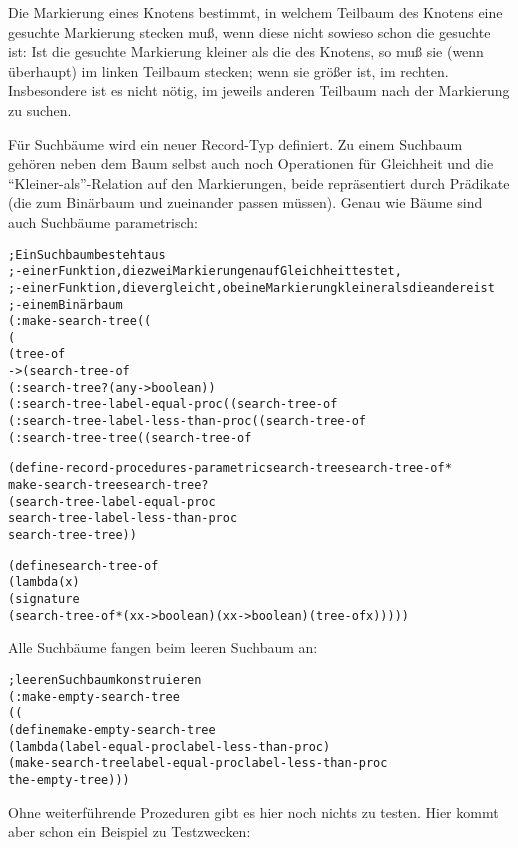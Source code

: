 Die Markierung eines Knotens bestimmt,
in welchem Teilbaum
des Knotens eine gesuchte Markierung stecken muß, wenn diese nicht sowieso schon die gesuchte ist: Ist die gesuchte
Markierung kleiner als die des Knotens, so muß sie (wenn überhaupt) im
linken Teilbaum stecken; wenn sie größer ist, im rechten.
Insbesondere ist es nicht nötig, im jeweils anderen Teilbaum nach der
Markierung zu suchen.

Für Suchbäume wird ein neuer Record-Typ
definiert. Zu einem Suchbaum
gehören neben dem Baum selbst auch noch Operationen für
Gleichheit und die "`Kleiner-als"'-Relation auf den Markierungen, beide repräsentiert durch
Prädikate (die zum Binärbaum und zueinander passen müssen).  Genau wie
Bäume sind auch Suchbäume parametrisch:
%
\begin{alltt}
; Ein Suchbaum besteht aus
; - einer Funktion, die zwei Markierungen auf Gleichheit testet,
; - einer Funktion, die vergleicht, ob eine Markierung kleiner als die andere ist
; - einem Binärbaum
(: make-search-tree ((%a %a -> boolean) 
                     (%a %a -> boolean) 
                     (tree-of %a) 
                         -> (search-tree-of %a)))
(: search-tree? (any -> boolean))
(: search-tree-label-equal-proc ((search-tree-of %a) -> (%a %a -> boolean)))
(: search-tree-label-less-than-proc ((search-tree-of %a) -> (%a %a -> boolean)))
(: search-tree-tree ((search-tree-of %a) -> (tree-of %a)))

(define-record-procedures-parametric search-tree search-tree-of*
  make-search-tree search-tree?
  (search-tree-label-equal-proc
   search-tree-label-less-than-proc
   search-tree-tree))

(define search-tree-of
  (lambda (x)
    (signature
     (search-tree-of* (x x -> boolean) (x x -> boolean) (tree-of x)))))
\end{alltt}
%
Alle Suchbäume fangen
beim leeren Suchbaum an:
%
\begin{alltt}
; leeren Suchbaum konstruieren
(: make-empty-search-tree
   ((%a %a -> boolean) (%a %a -> boolean) -> (search-tree-of %a)))
(define make-empty-search-tree
  (lambda (label-equal-proc label-less-than-proc)
    (make-search-tree label-equal-proc label-less-than-proc
                      the-empty-tree)))
\end{alltt}
%
Ohne weiterführende Prozeduren gibt es hier noch nichts zu testen. Hier kommt
aber schon ein Beispiel zu Testzwecken:

